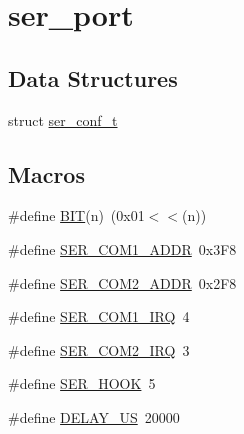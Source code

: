 \hypertarget{group__ser__port}{}\section{ser\+\_\+port}
\label{group__ser__port}
\subsection*{Data Structures}
\begin{DoxyCompactItemize}
\item 
struct \hyperlink{structser__conf__t}{ser\+\_\+conf\+\_\+t}
\end{DoxyCompactItemize}
\subsection*{Macros}
\begin{DoxyCompactItemize}
\item 
\#define \hyperlink{group__ser__port_ga3a8ea58898cb58fc96013383d39f482c}{B\+IT}(n)~(0x01$<$$<$(n))
\item 
\#define \hyperlink{group__ser__port_ga98199cd85fbe47b9a741b07762260422}{S\+E\+R\+\_\+\+C\+O\+M1\+\_\+\+A\+D\+DR}~0x3\+F8
\item 
\#define \hyperlink{group__ser__port_ga62c7a28d9eaa93631e7bb202f91dddcf}{S\+E\+R\+\_\+\+C\+O\+M2\+\_\+\+A\+D\+DR}~0x2\+F8
\item 
\#define \hyperlink{group__ser__port_gaf0ec610995d060379690114f01c6eeaf}{S\+E\+R\+\_\+\+C\+O\+M1\+\_\+\+I\+RQ}~4
\item 
\#define \hyperlink{group__ser__port_ga420c631d8b538f2a8058e793523149e2}{S\+E\+R\+\_\+\+C\+O\+M2\+\_\+\+I\+RQ}~3
\item 
\#define \hyperlink{group__ser__port_ga673bc80505f70c750fe685caf9a0d6b0}{S\+E\+R\+\_\+\+H\+O\+OK}~5
\item 
\#define \hyperlink{group__ser__port_ga1a522aa19bcb695a9df30032a893bee3}{D\+E\+L\+A\+Y\+\_\+\+US}~20000
\end{DoxyCompactItemize}
